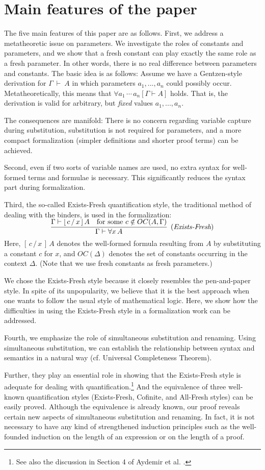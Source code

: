 \documentclass{svjour3}                     %
\newcommand{\seqr}[3]{\rbm{\infer{#2}{#1}}\;\;\text{$#3$}}
\newcommand{\Ga}{\Gamma}
\newcommand{\De}{\Delta}
\newcommand{\vd}{\vdash}
\newcommand{\substs}[3]{[\, #3\, \slash\, #2\,]\, #1}
\newcommand{\rbm}[1]{\raisebox{-1.5ex}[0.5ex]{$#1$}}
\begin{document}
\section{Main features of the paper}\label{features}
The five main features of this paper are as follows. 
First, we address a metatheoretic issue on parameters. We investigate
the roles of constants and parameters, and we show that a fresh constant
can play exactly the same role as a fresh parameter. In other words, there is no real difference between parameters and constants.
The basic idea is as follows: Assume we have a Gentzen-style derivation for $\Ga~\vdash~A$ in which parameters $a_1, ..., a_n$ could possibly occur. Metatheoretically, this means that $\forall a_1\,\cdots\,a_n [\Ga \vdash A]$ holds. That is, the derivation is valid for arbitrary, but {\em fixed} values $a_1, ..., a_n$.

The consequences are manifold: There is no concern regarding variable capture during substitution, substitution is not required for parameters, and a more compact formalization (simpler definitions and shorter proof terms) can be achieved.

Second, even if two sorts of variable names are used, no extra syntax
for well-formed terms and formulae is necessary. This significantly
reduces the syntax part during formalization.

Third, the so-called Exists-Fresh quantification style, the traditional method of dealing with the binders, is used in the formalization:
\[
\seqr{\Ga \vd \substs{A}{x}{c} & \text{for some }c \notin OC(A, \Ga)}{\Ga \vd \forall x\, A}{(\textit{Exists-Fresh})}
\]
Here, $\substs{A}{x}{c}$ denotes the well-formed formula resulting from $A$ by substituting a constant $c$ for $x$, and $OC(\De)$ denotes the set of constants occurring in the context $\De$. (Note that we use fresh constants as fresh parameters.) 

We chose the Exists-Fresh style because it closely resembles the pen-and-paper style. In spite of its unpopularity, we believe that it is the best approach when one wants to follow the usual style of mathematical logic. Here, we show how the difficulties in using the Exists-Fresh style in a formalization work can be addressed.

Fourth, we emphasize the role of simultaneous substitution and renaming.
Using simultaneous substitution, we can establish the relationship between syntax and semantics in a natural way (cf. Universal Completeness Theorem).

Further, they play an essential role in showing that the Exists-Fresh style is adequate for dealing with quantification.\footnote{See also the discussion in Section 4 of Aydemir et al. \cite{engineering}.} And the equivalence of three well-known quantification styles (Exists-Fresh, Cofinite, and All-Fresh styles) can be easily proved. Although the equivalence is already known, our proof reveals certain new aspects of simultaneous substitution and renaming. In fact, it is not necessary to have any kind of strengthened induction principles such as the well-founded induction on the length of an expression or on the length of a proof. 
\end{document}
